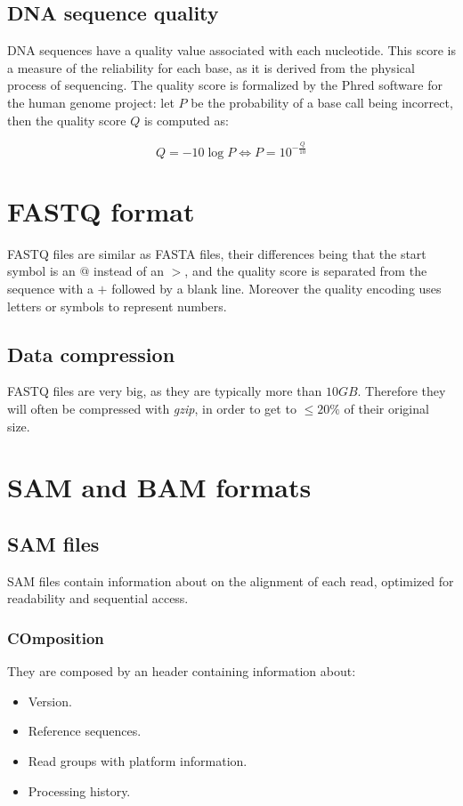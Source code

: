 	\subsection{DNA sequence quality}
	DNA sequences have a quality value associated with each nucleotide.
	This score is a measure of the reliability for each base, as it is derived from the physical process of sequencing.
	The quality score is formalized by the Phred software for the human genome project: let $P$ be the probability of a base call being incorrect, then the quality score $Q$ is computed as:

	$$Q = -10\log P \Leftrightarrow P = 10^{-\frac{Q}{10}}$$

\section{FASTQ format}
FASTQ files are similar as FASTA files, their differences being that the start symbol is an $@$ instead of an $>$, and the quality score is separated from the sequence with a $+$ followed by a blank line.
Moreover the quality encoding uses letters or symbols to represent numbers.

	\subsection{Data compression}
	FASTQ files are very big, as they are typically more than $10GB$.
	Therefore they will often be compressed with \emph{gzip}, in order to get to $\le 20\%$ of their original size.

\section{SAM and BAM formats}

	\subsection{SAM files}
	SAM files contain information about on the alignment of each read, optimized for readability and sequential access.

		\subsubsection{COmposition}
		They are composed by an header containing information about:

		\begin{multicols}{2}
			\begin{itemize}
				\item Version.
				\item Reference sequences.
				\item Read groups with platform information.
				\item Processing history.
			\end{itemize}
		\end{multicols}

